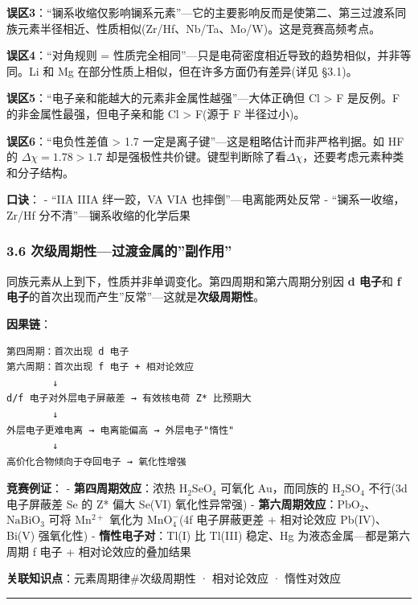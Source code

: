 \textbf{误区3}：``镧系收缩仅影响镧系元素''---它的主要影响反而是使第二、第三过渡系同族元素半径相近、性质相似(Zr/Hf、Nb/Ta、Mo/W)。这是竞赛高频考点。

\textbf{误区4}：``对角规则 = 性质完全相同''---只是电荷密度相近导致的趋势相似，并非等同。Li 和 Mg 在部分性质上相似，但在许多方面仍有差异(详见 §3.1)。

\textbf{误区5}：``电子亲和能越大的元素非金属性越强''---大体正确但 Cl \textgreater{} F 是反例。F 的非金属性最强，但电子亲和能 Cl \textgreater{} F(源于 F 半径过小)。

\textbf{误区6}：``电负性差值 \textgreater{} 1.7 一定是离子键''---这是粗略估计而非严格判据。如 HF 的 \(\Delta\chi=1.78>1.7\) 却是强极性共价键。键型判断除了看\(\Delta\chi\)，还要考虑元素种类和分子结构。

\textbf{口诀}：
- ``IIA IIIA 绊一跤，VA VIA 也摔倒''---电离能两处反常
- ``镧系一收缩，Zr/Hf 分不清''---镧系收缩的化学后果

\subsubsection{3.6 次级周期性---过渡金属的''副作用''}\label{ux6b21ux7ea7ux5468ux671fux6027ux8fc7ux6e21ux91d1ux5c5eux7684ux526fux4f5cux7528}

同族元素从上到下，性质并非单调变化。第四周期和第六周期分别因 \textbf{d 电子}和 \textbf{f 电子}的首次出现而产生''反常''---这就是\textbf{次级周期性}。

\textbf{因果链}：

\begin{verbatim}
第四周期：首次出现 d 电子
第六周期：首次出现 f 电子 + 相对论效应
        ↓
d/f 电子对外层电子屏蔽差 → 有效核电荷 Z* 比预期大
        ↓
外层电子更难电离 → 电离能偏高 → 外层电子"惰性"
        ↓
高价化合物倾向于夺回电子 → 氧化性增强
\end{verbatim}

\textbf{竞赛例证}：
- \textbf{第四周期效应}：浓热 \(\mathrm{H_2SeO_4}\) 可氧化 Au，而同族的 \(\mathrm{H_2SO_4}\) 不行(3d 电子屏蔽差 \箭 Se 的 Z* 偏大 \箭 Se(VI) 氧化性异常强)
- \textbf{第六周期效应}：\(\mathrm{PbO_2}\)、\(\mathrm{NaBiO_3}\) 可将 \(\mathrm{Mn^{2+}}\) 氧化为 \(\mathrm{MnO_4^-}\)(4f 电子屏蔽更差 + 相对论效应 \箭 Pb(IV)、Bi(V) 强氧化性)
- \textbf{惰性电子对}：Tl(I) 比 Tl(III) 稳定、Hg 为液态金属---都是第六周期 f 电子 + 相对论效应的叠加结果

\textbf{关联知识点}：元素周期律\#次级周期性 · 相对论效应 · 惰性对效应

\begin{center}\rule{0.5\linewidth}{0.5pt}\end{center}

